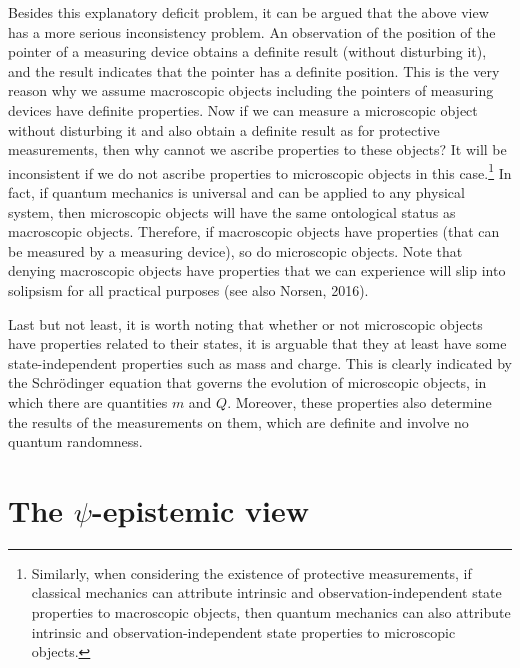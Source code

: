 Besides this explanatory deficit problem, it can be argued that the above view has a more serious inconsistency problem. An observation of the position of the pointer of a measuring device obtains a definite result (without disturbing it), and the result indicates that the pointer has a definite position. This is the very reason why we assume macroscopic objects including the pointers of measuring devices have definite properties. Now if we can measure a microscopic object without disturbing it and also obtain a definite result as for protective measurements, then why cannot we ascribe properties to these objects? It will be inconsistent if we do not ascribe properties to microscopic objects in this case.\footnote{Similarly, when considering the existence of protective measurements, if classical mechanics can attribute intrinsic and observation-independent state properties to macroscopic objects, then quantum mechanics can also attribute intrinsic and observation-independent state properties to microscopic objects.} In fact, if quantum mechanics is universal and can be applied to any physical system, then microscopic objects will have the same ontological status as macroscopic objects. Therefore, if macroscopic objects have properties (that can be measured by a measuring device), so do microscopic objects. Note that denying macroscopic objects have  properties that we can experience will slip into solipsism for all practical purposes (see also Norsen, 2016). 

Last but not least, it is worth noting that whether or not microscopic objects have properties related to their states, it is arguable that they at least have some state-independent properties such as mass and charge. This is clearly indicated by the Schr\"{o}dinger equation that governs the evolution of microscopic objects, in which there are quantities $m$ and $Q$. Moreover, these properties also determine the results of the measurements on them, which are definite and involve no quantum randomness.

\section{The $\psi$-epistemic view}

